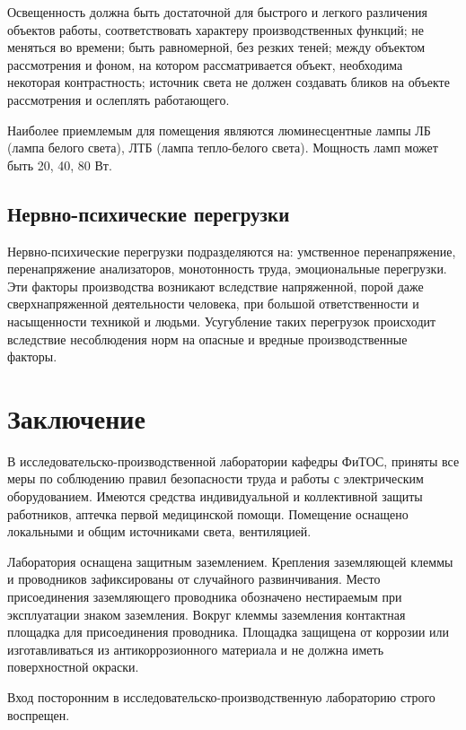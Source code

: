 Освещенность должна быть достаточной для быстрого и легкого различения объектов работы, соответствовать характеру производственных функций; не меняться во времени; быть равномерной, без резких теней; между объектом рассмотрения и фоном, на котором рассматривается объект, необходима некоторая контрастность; источник света не должен создавать бликов на объекте рассмотрения и ослеплять работающего.

Наиболее приемлемым для помещения являются люминесцентные лампы ЛБ (лампа белого  света), ЛТБ (лампа тепло-белого   света). Мощность ламп может  быть 20, 40, 80 Вт.

\subsection{Нервно-психические перегрузки}

Нервно-психические перегрузки подразделяются на: умственное перенапряжение, перенапряжение анализаторов, монотонность труда, эмоциональные перегрузки. Эти факторы производства возникают вследствие напряженной, порой даже сверхнапряженной деятельности человека, при большой ответственности и насыщенности техникой и людьми. Усугубление таких перегрузок происходит вследствие несоблюдения норм на опасные и вредные производственные факторы.

\section{Заключение}

В исследовательско-производственной лаборатории кафедры ФиТОС, приняты все меры по соблюдению правил безопасности труда и работы с электрическим оборудованием. Имеются средства индивидуальной и коллективной защиты работников, аптечка первой медицинской помощи. Помещение оснащено локальными и общим источниками света, вентиляцией. 

Лаборатория оснащена защитным заземлением. Крепления заземляющей клеммы и проводников зафиксированы от случайного развинчивания. Место присоединения заземляющего проводника обозначено нестираемым при эксплуатации знаком заземления. Вокруг клеммы заземления контактная площадка для присоединения проводника. Площадка защищена от коррозии или изготавливаться из антикоррозионного материала и не должна иметь поверхностной окраски.

Вход посторонним в исследовательско-производственную лабораторию строго воспрещен.
